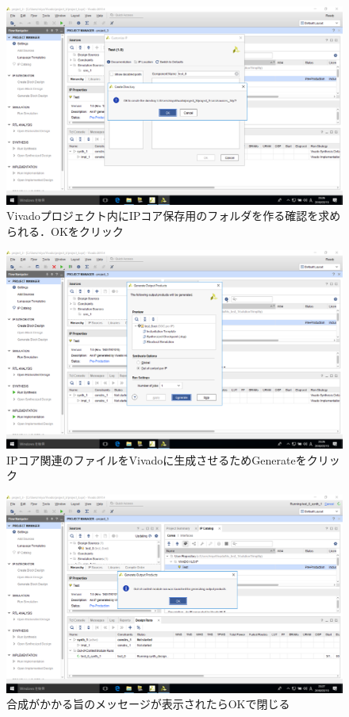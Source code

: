\documentclass[a4paper,dvipdfmx]{jsarticle}
\begin{document}
 \begin{figure}[H]
  \begin{center}
   \includegraphics[width=.8\textwidth]{chapter08_figures/VirtualBox_Windows10_19_03_2018_23_26_49.png}
  \end{center}
  \caption{Vivadoプロジェクト内にIPコア保存用のフォルダを作る確認を求められる．OKをクリック}
 \end{figure}

 \begin{figure}[H]
  \begin{center}
   \includegraphics[width=.8\textwidth]{chapter08_figures/VirtualBox_Windows10_19_03_2018_23_26_56.png}
  \end{center}
  \caption{IPコア関連のファイルをVivadoに生成させるためGenerateをクリック}
 \end{figure}

 \begin{figure}[H]
  \begin{center}
   \includegraphics[width=.8\textwidth]{chapter08_figures/VirtualBox_Windows10_19_03_2018_23_27_16.png}
  \end{center}
  \caption{合成がかかる旨のメッセージが表示されたらOKで閉じる}
 \end{figure}
\end{document}
